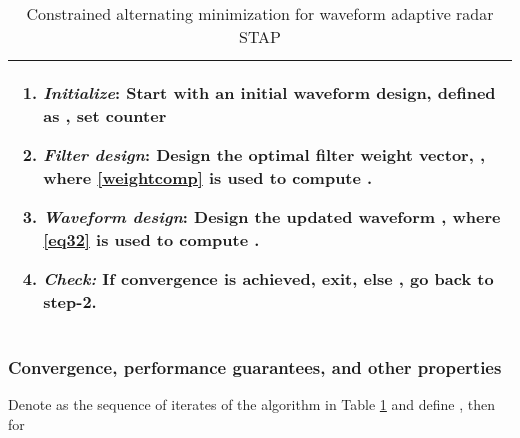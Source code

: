 \documentclass[11pt,draftclsnofoot,onecolumn]{IEEEtran}
\theoremstyle{definition}
\theoremstyle{remark}
\begin{document}
\begin{table}[htbp!] 
\centering
\caption{Constrained alternating minimization for waveform adaptive radar STAP}
\begin{tabular}{|p{3.3in}|} 
\hline
\begin{enumerate} \label{table1}
\item {\it Initialize}: Start with  an initial waveform design, defined as , set counter 
\item { \it Filter design}: Design the optimal filter weight vector, 
, where \eqref{weightcomp} is used to compute .
\item{ \it Waveform design}: Design the updated waveform , where \eqref{eq32} is used to compute .
\item {\it Check:} If convergence is achieved, exit, else , go back to step-2.
\end{enumerate} \\
\hline
\end{tabular}
\end{table}

\subsubsection{Convergence, performance guarantees, and other properties} Denote  as the sequence of iterates of the algorithm in Table \ref{table1} and define , then for 
\end{document}
